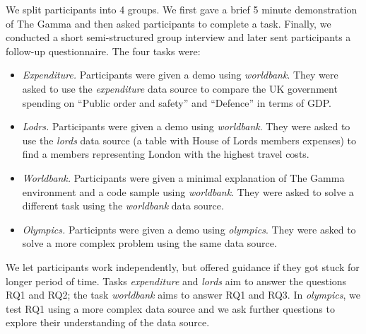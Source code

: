 \documentclass[manuscript,review,anonymous]{acmart}
\begin{document}
We split participants into 4 groups. We first gave a brief 5 minute demonstration of The
Gamma and then asked participants to complete a task. Finally, we conducted a short semi-structured
group interview and later sent participants a follow-up questionnaire. The four tasks were:

\begin{itemize}
\item \emph{Expenditure.} Participants were given a demo using \emph{worldbank}.
  They were asked to use the \emph{expenditure} data source to compare the UK government spending
  on ``Public order and safety'' and ``Defence'' in terms of GDP.
\item \emph{Lodrs.} Participants were given a demo using \emph{worldbank}.
  They were asked to use the \emph{lords} data source (a table with House of Lords
  members expenses) to find a members representing London with the highest travel costs.
\item \emph{Worldbank.} Participants were given a minimal explanation of The Gamma environment and
  a code sample using \emph{worldbank}. They were asked to solve a different task using
  the \emph{worldbank} data source.
\item \emph{Olympics.} Participnts were given a demo using \emph{olympics}.
  They were asked to solve a more complex problem using the same data source.
\end{itemize}

We let participants work independently, but offered guidance if they got stuck for longer period of
time. Tasks \emph{expenditure} and \emph{lords} aim to answer the questions RQ1 and RQ2; the task
\emph{worldbank} aims to answer RQ1 and RQ3. In \emph{olympics}, we test RQ1 using a more complex
data source and we ask further questions to explore their understanding of the data source.
\end{document}
